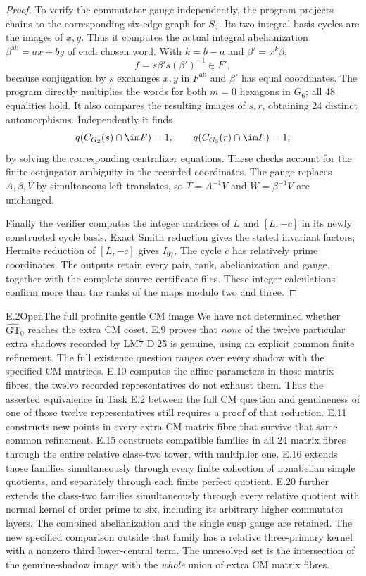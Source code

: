 \begin{proof}
To verify the commutator gauge independently, the program projects
chains to the corresponding six-edge graph for $S_3$. Its two
integral basis cycles are the images of $x,y$. Thus it computes the
actual integral abelianization $\beta^{\mathrm{ab}}=ax+by$ of each
chosen word. With $k=b-a$ and $\beta'=x^k\beta$,
\[
 f=s\beta's(\beta')^{-1}\in F',
\]
because conjugation by $s$ exchanges $x,y$ in $F^{\mathrm{ab}}$ and
$\beta'$ has equal coordinates. The program directly multiplies the
words for both $m=0$ hexagons in $G_6$; all 48 equalities hold.
It also compares the resulting images of $s,r$, obtaining 24 distinct
automorphisms. Independently it finds
\[
 q(C_{G_2}(s)\cap\im F)=1,
 \qquad q(C_{G_3}(r)\cap\im F)=1,
\]
by solving the corresponding centralizer equations. These checks
account for the finite conjugator ambiguity in the recorded
coordinates. The gauge replaces $A,\beta,V$ by simultaneous left
translates, so $T=A^{-1}V$ and $W=\beta^{-1}V$ are unchanged.

Finally the verifier computes the integer matrices of $L$ and
$[L,-c]$ in its newly constructed cycle basis. Exact Smith reduction
gives the stated invariant factors; Hermite reduction of $[L,-c]$
gives $I_{97}$. The cycle $c$ has relatively prime coordinates.
The outputs retain every pair, rank, abelianization and gauge, together
with the complete source certificate files. These integer calculations
confirm more than the ranks of the maps modulo two and three.
\end{proof}

\begin{statement}{E.2}{Open}{The full profinite gentle CM image}
We have not determined whether $\widehat{\mathrm{GT}}_0$ reaches the
extra CM coset. E.9 proves that \emph{none} of the twelve particular
extra shadows recorded by LM7 D.25 is genuine, using an explicit
common finite refinement. The full existence question ranges over
every shadow with the specified CM matrices. E.10 computes the
affine parameters in those matrix fibres; the twelve recorded
representatives do not exhaust them. Thus the asserted equivalence
in Task E.2 between the full CM question and genuineness of one of
those twelve representatives still requires a proof of that reduction.
E.11 constructs new points in every extra CM matrix fibre that
survive that same common refinement. E.15 constructs compatible
families in all 24 matrix fibres through the entire relative
class-two tower, with multiplier one. E.16 extends those families
simultaneously through every finite collection of nonabelian simple
quotients, and separately through each finite perfect quotient.
E.20 further extends the class-two families simultaneously through
every relative quotient with normal kernel of order prime to six,
including its arbitrary higher commutator layers. The combined
abelianization and the single cusp gauge are retained. The new
specified comparison outside that family has a relative three-primary
kernel with a nonzero third lower-central term. The unresolved set is the
intersection of the genuine-shadow image with the \emph{whole}
union of extra CM matrix fibres.
\end{statement}

